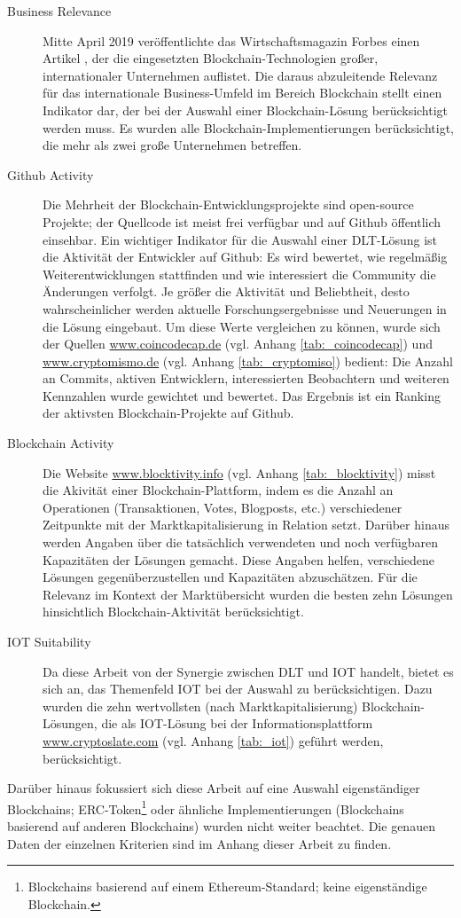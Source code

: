 \begin{description}
  \item[Business Relevance] Mitte April 2019 veröffentlichte das Wirtschaftsmagazin Forbes einen Artikel \cite{castillo2019}, der die eingesetzten Blockchain-Technologien großer, internationaler Unternehmen auflistet. Die daraus abzuleitende Relevanz für das internationale Business-Umfeld im Bereich Blockchain stellt einen Indikator dar, der bei der Auswahl einer Blockchain-Lösung berücksichtigt werden muss. Es wurden alle Blockchain-Implementierungen berücksichtigt, die mehr als zwei große Unternehmen betreffen.
  \item[Github Activity] Die Mehrheit der Blockchain-Entwicklungsprojekte sind open-source Projekte; der Quellcode ist meist frei verfügbar und auf Github öffentlich einsehbar. Ein wichtiger Indikator für die Auswahl einer \ac{DLT}-Lösung ist die Aktivität der Entwickler auf Github: Es wird bewertet, wie regelmäßig Weiterentwicklungen stattfinden und wie interessiert die Community die Änderungen verfolgt. Je größer die Aktivität und Beliebtheit, desto wahrscheinlicher werden aktuelle Forschungsergebnisse und Neuerungen in die Lösung eingebaut. Um diese Werte vergleichen zu können, wurde sich der Quellen \url{www.coincodecap.de} (vgl. Anhang \ref{tab:_coincodecap}) und \url{www.cryptomismo.de} (vgl. Anhang \ref{tab:_cryptomiso}) bedient: Die Anzahl an Commits, aktiven Entwicklern, interessierten Beobachtern und weiteren Kennzahlen wurde gewichtet und bewertet. Das Ergebnis ist ein Ranking der aktivsten Blockchain-Projekte auf Github.
  \item[Blockchain Activity] Die Website \url{www.blocktivity.info} (vgl. Anhang \ref{tab:_blocktivity}) misst die Akivität einer Blockchain-Plattform, indem es die Anzahl an Operationen (Transaktionen, Votes, Blogposts, etc.) verschiedener Zeitpunkte mit der Marktkapitalisierung in Relation setzt. Darüber hinaus werden Angaben über die tatsächlich verwendeten und noch verfügbaren Kapazitäten der Lösungen gemacht. Diese Angaben helfen, verschiedene Lösungen gegenüberzustellen und Kapazitäten abzuschätzen. Für die Relevanz im Kontext der Marktübersicht wurden die besten zehn Lösungen hinsichtlich Blockchain-Aktivität berücksichtigt.
  \item[IOT Suitability] Da diese Arbeit von der Synergie zwischen \ac{DLT} und \ac{IOT} handelt, bietet es sich an, das Themenfeld \ac{IOT} bei der Auswahl zu berücksichtigen. Dazu wurden die zehn wertvollsten (nach Marktkapitalisierung) Blockchain-Lösungen, die als \ac{IOT}-Lösung bei der Informationsplattform \url{www.cryptoslate.com} (vgl. Anhang \ref{tab:_iot}) geführt werden, berücksichtigt.
\end{description}
Darüber hinaus fokussiert sich diese Arbeit auf eine Auswahl eigenständiger Blockchains; ERC-Token\footnote{Blockchains basierend auf einem Ethereum-Standard; keine eigenständige Blockchain.} oder ähnliche Implementierungen (Blockchains basierend auf anderen Blockchains) wurden nicht weiter beachtet. Die genauen Daten der einzelnen Kriterien sind im Anhang dieser Arbeit zu finden.

